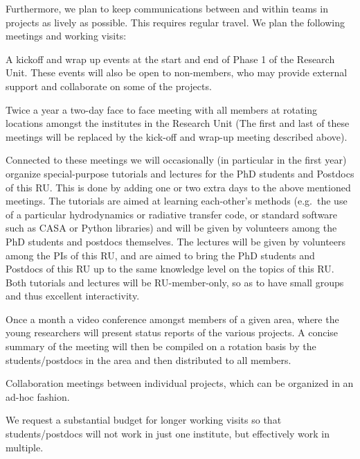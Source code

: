 \documentclass[10pt,fleqn,twoside,a4paper]{article}
\begin{document}
Furthermore, we plan to keep communications between and within teams in
projects as lively as possible. This requires regular travel.
We plan the following meetings and working visits:
\begin{compactitemize}
\item A kickoff and wrap up events at the start and end of Phase 1 of the
  Research Unit. These events will also be open to non-members, who may
  provide external support and collaborate on some of the projects.
\item Twice a year a two-day face to face meeting with all members at
  rotating locations amongst the institutes in the Research Unit (The
  first and last of these meetings will be replaced by the kick-off
  and wrap-up meeting described above). 
\item Connected to these meetings we will occasionally (in particular in the
  first year) organize special-purpose tutorials and lectures for the PhD
  students and Postdocs of this RU. This is done by adding one or two extra
  days to the above mentioned meetings. The tutorials are aimed at learning
  each-other's methods (e.g.\ the use of a particular hydrodynamics or
  radiative transfer code, or standard software such as CASA or Python
  libraries) and will be given by volunteers among the PhD students and
  postdocs themselves. The lectures will be given by volunteers among the
  PIs of this RU, and are aimed to bring the PhD students and Postdocs of
  this RU up to the same knowledge level on the topics of this RU.  Both
  tutorials and lectures will be RU-member-only, so as to have small groups
  and thus excellent interactivity.
\item Once a month a video conference amongst members of a given area, where
  the young researchers will present status reports of the various
  projects. A concise summary of the meeting will then be compiled on a
  rotation basis by the students/postdocs in the area and then distributed
  to all members.
\item Collaboration meetings between individual projects, which can be 
  organized in an ad-hoc fashion.
\item We request a substantial budget for longer working visits so that
  students/postdocs will not work in just one institute, but effectively
  work in multiple.
\end{compactitemize}


\end{document}

